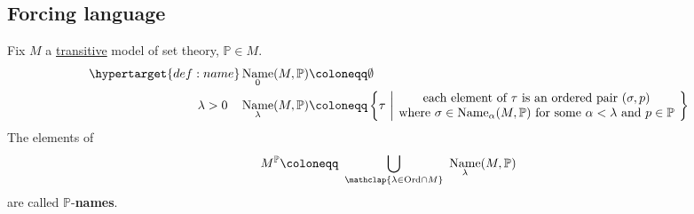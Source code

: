 \documentclass{article}
\newcommand{\named}[1]{\textbf{#1}\index{#1}}
\newcommand{\1}{\mathbbm{1}}
\DeclareMathOperator{\name}{Name}
\begin{document}
\subsection{Forcing language}
\begin{defi}
Fix $M$ a \hyperlink{def:transitive}{transitive} model of set theory, $\mathbb{P} \in M$.
\begin{align*}
  \hypertarget{def:name}\name_0(M, \mathbb{P}) &\coloneqq \emptyset \\
  \lambda> 0 \quad \name_\lambda(M, \mathbb{P}) &\coloneqq \left\{\tau\ \middle\vert \parbox{23em}{\centering each element of $\tau$ is an ordered pair $(\sigma,p)$ \\ where $\sigma \in \name_\alpha(M,\mathbb{P})$ for some $\alpha < \lambda$ and $p \in \mathbb{P}$}\right\}
\end{align*}
The elements of
\begin{align*}
  M^{\mathbb{P}} \coloneqq\ \bigcup_{\mathclap{\lambda \in \text{Ord} \cap M}}\ \name_\lambda(M,\mathbb{P})
\end{align*}
are called $\mathbb{P}$-\named{names}.
\end{defi}
\end{document}

